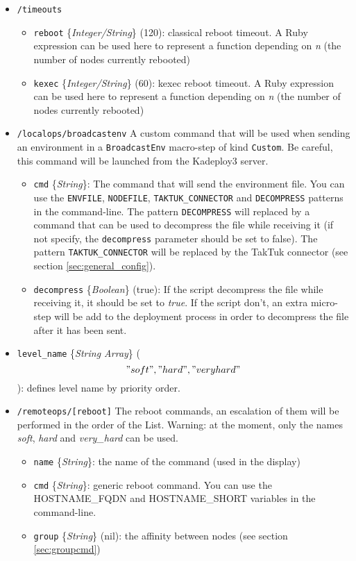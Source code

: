 \documentclass[a4wide,10pt,oneside]{book}
\newcommand{\ypath}[1]{\texttt{#1}}
\newcommand{\yfield}[2]{\texttt{#1} {\small\{{\emph{#2}}\}}:}
\newcommand{\yfieldd}[3]{\texttt{#1} {\small\{{\emph{#2}}\}} {\small(}#3{\small)}:}
\begin{document}
\begin{itemize}
  \item \ypath{/timeouts}
  \begin{itemize}
    \item \yfieldd{reboot}{Integer/String}{120} classical reboot timeout. A Ruby expression can be used here to represent a function depending on \emph{n} (the number of nodes currently rebooted)
    \item \yfieldd{kexec}{Integer/String}{60} kexec reboot timeout. A Ruby expression can be used here to represent a function depending on \emph{n} (the number of nodes currently rebooted)
  \end{itemize}
  \item \ypath{/localops/broadcastenv} A custom command that will be used when sending an environment in a \texttt{BroadcastEnv} macro-step of kind \texttt{Custom}. Be careful, this command will be launched from the Kadeploy3 server.
  \begin{itemize}
    \item \yfield{cmd}{String} The command that will send the environment file. You can use the \texttt{ENVFILE}, \texttt{NODEFILE}, \texttt{TAKTUK\_CONNECTOR} and \texttt{DECOMPRESS} patterns in the command-line. The pattern \texttt{DECOMPRESS} will replaced by a command that can be used to decompress the file while receiving it (if not specify, the \texttt{decompress} parameter should be set to false). The pattern \texttt{TAKTUK\_CONNECTOR} will be replaced by the TakTuk connector (see section \ref{sec:general_config}).
    \item \yfieldd{decompress}{Boolean}{true} If the script decompress the file while receiving it, it should be set to \emph{true}. If the script don't, an extra micro-step will be add to the deployment process in order to decompress the file after it has been sent.
  \end{itemize}
  \item \yfieldd{level\_name}{String Array}{\["soft","hard","very hard"\]} defines level name by priority order.
  \item \ypath{/remoteops/[reboot]} The reboot commands, an escalation of them will be performed in the order of the List. Warning: at the moment, only the names \emph{soft}, \emph{hard} and \emph{very\_hard} can be used.
  \begin{itemize}
    \item \yfield{name}{String} the name of the command (used in the display)
    \item \yfield{cmd}{String} generic reboot command. You can use the HOSTNAME\_FQDN and HOSTNAME\_SHORT variables in the command-line.
    \item \yfieldd{group}{String}{nil} the affinity between nodes (see section \ref{sec:groupcmd})
  \end{itemize}


\end{itemize}
\end{document}
